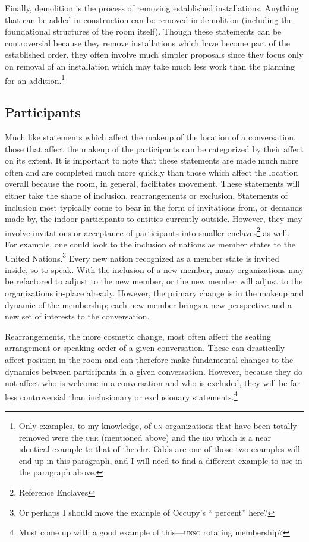 \documentclass{article}
\begin{document}
Finally, demolition is the process of removing established installations.
Anything that can be added in construction can be removed in demolition (including the foundational structures of the room itself).
Though these statements can be controversial because they remove installations which have become part of the established order, they often involve much simpler proposals since they focus only on removal of an installation which may take much less work than the planning for an addition.\footnote{Only examples, to my knowledge, of \textsc{un} organizations that have been totally removed were the \textsc{chr} (mentioned above) and the \textsc{iro} which is a near identical example to that of the chr. Odds are one of those two examples will end up in this paragraph, and I will need to find a different example to use in the paragraph above.}

\subsection{Participants}
Much like statements which affect the makeup of the location of a conversation, those that affect the makeup of the participants can be categorized by their affect on its extent.
It is important to note that these statements are made much more often and are completed much more quickly than those which affect the location overall because the room, in general, facilitates movement.
These statements will either take the shape of inclusion, rearrangements or exclusion.
Statements of inclusion most typically come to bear in the form of invitations from, or demands made by, the indoor participants to entities currently outside.
However, they may involve invitations or acceptance of participants into smaller enclaves\footnote{Reference Enclaves} as well.
For example, one could look to the inclusion of nations as member states to the United Nations.\footnote{Or perhaps I should move the example of Occupy's `` percent'' here?}
Every new nation recognized as a member state is invited inside, so to speak.
With the inclusion of a new member, many organizations may be refactored to adjust to the new member, or the new member will adjust to the organizations in-place already.
However, the primary change is in the makeup and dynamic of the membership; each new member brings a new perspective and a new set of interests to the conversation.

Rearrangements, the more cosmetic change, most often affect the seating arrangement or speaking order of a given conversation.
These can drastically affect position in the room and can therefore make fundamental changes to the dynamics between participants in a given conversation.
However, because they do not affect who is welcome in a conversation and who is excluded, they will be far less controversial than inclusionary or exclusionary statements.\footnote{Must come up with a good example of this---\textsc{unsc} rotating membership?}
\end{document}
